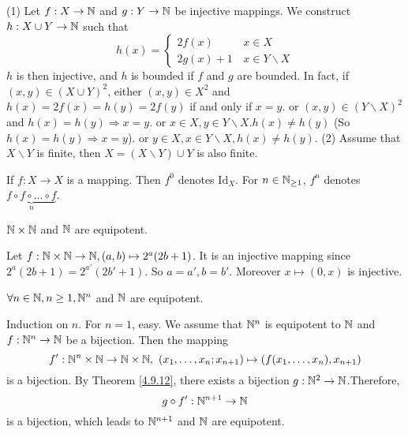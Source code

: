 \begin{proofenv}
    \quad
    \newline
    (1) Let $f:X\rightarrow \NN$ and $g:Y\rightarrow \NN$ be injective mappings. We construct $h:X\cup Y\rightarrow \NN$ such that 
    $$h(x)=\left\{\begin{matrix}
     2f(x)\,  &x\in X\\
    2g(x)+1\, &x\in Y\backslash X

    \end{matrix}\right.$$
    $h$ is then injective,  and $h$ is bounded if $f$ and $g$ are bounded.
    \newline
    In fact,  if $(x, y)\in (X\cup Y)^2$, 
    \newline
    either $(x, y)\in X^2$ and $h(x)=2f(x)=h(y)=2f(y)$ if and only if $x=y$.
    \newline
    or $(x, y)\in (Y\backslash X)^2$ and $h(x)=h(y)\Rightarrow x=y$.
    \newline
    or $x\in X, y\in Y\backslash X.h(x)\not=h(y)$ (So $h(x)=h(y)\Rightarrow x=y$).
    \newline
    or $y\in X, x\in Y\backslash X , h(x)\not=h(y)$.
    \newline
    (2)  Assume that $X\backslash Y$ is finite,  then $X=(X\backslash Y)\cup Y$ is also finite.
\end{proofenv}
\begin{notationenv}
    If $f:X\rightarrow X$  is a mapping. Then $f^0$ denotes $\mathrm{Id}_X$. For $n\in\NN_{\ge 1}$, $f^n$ denotes $\underset{n}{\underbrace{f\circ f\circ \dots \circ f}}$. 
\end{notationenv}
\begin{theoremenv}\label{4.9.12}
    $\NN\times\NN$ and $\NN$ are equipotent.
\end{theoremenv}
\begin{proofenv}
    Let $f:\NN\times\NN\rightarrow \NN, (a, b)\mapsto2^a(2b+1)$. It is an injective mapping since $2^a(2b+1)=2^{a'}(2b'+1)$. So $a=a', b=b'$. Moreover $x\mapsto(0, x)$ is injective.
\end{proofenv}
\begin{corollaryenv}
    $\forall n\in \NN,  n\ge 1, \NN^n$ and $\NN$ are equipotent.
\end{corollaryenv}
\begin{proofenv}
    Induction on $n$.
    \newline
    For $n=1$,  easy. We assume that $\NN^n$ is equipotent to $\NN$ and $f:\NN^n\rightarrow\NN$ be a bijection. Then the mapping
    $$f':\NN^n\times \NN\rightarrow \NN\times\NN, \ \left(x_1, \dots, x_n;x_{n+1}\right)\mapsto\left(f(x_1, \dots, x_n), x_{n+1}\right)$$ 
    is a bijection. By Theorem \ref{4.9.12},  there exists a bijection $g:\NN^2\rightarrow\NN$.Therefore, 
    $$g\circ f':\NN^{n+1}\rightarrow\NN$$
    is a bijection,  which leads to $\NN^{n+1}$ and $\NN$ are equipotent.
\end{proofenv}


